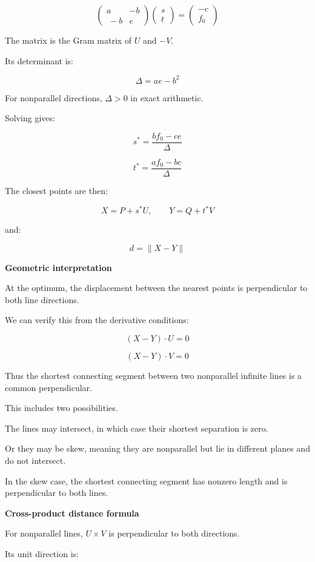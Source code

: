 \[
\boxed{ \begin{pmatrix} a&-b\\\ -b&e \end{pmatrix} \begin{pmatrix}s\\t\end{pmatrix} = \begin{pmatrix}-c\\f_0\end{pmatrix} }
\]

The matrix is the Gram matrix of \(U\) and \(-V\).

Its determinant is:

\[
\boxed{\Delta=ae-b^2}
\]

For nonparallel directions, \(\Delta>0\) in exact arithmetic.

Solving gives:

\[
\boxed{ s^*=\frac{bf_0-ce}{\Delta} }
\]

\[
\boxed{ t^*=\frac{af_0-bc}{\Delta} }
\]

The closest points are then:

\[
\boxed{ X=P+s^*U,\qquad Y=Q+t^*V }
\]

and:

\[
\boxed{d=\|X-Y\|}
\]

\textbf{Geometric interpretation}

At the optimum, the displacement between the nearest points is perpendicular to both line directions.

We can verify this from the derivative conditions:

\[
(X-Y)\cdot U=0
\]

\[
(X-Y)\cdot V=0
\]

Thus the shortest connecting segment between two nonparallel infinite lines is a common perpendicular.

This includes two possibilities.

The lines may intersect, in which case their shortest separation is zero.

Or they may be skew, meaning they are nonparallel but lie in different planes and do not intersect.

In the skew case, the shortest connecting segment has nonzero length and is perpendicular to both lines.

\textbf{Cross-product distance formula}

For nonparallel lines, \(U\times V\) is perpendicular to both directions.

Its unit direction is:

